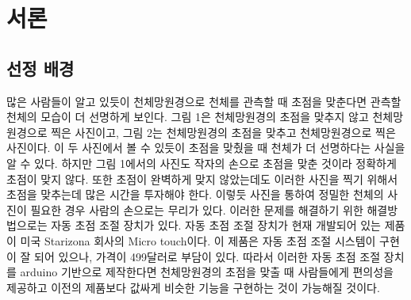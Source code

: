 \documentclass{abstract_hutech}
\begin{document}
\thispagestyle{firstpage}

\section{서론}

\subsection{선정 배경}

많은 사람들이 알고 있듯이 천체망원경으로 천체를 관측할 때 초점을 맞춘다면 관측할 천체의 모습이 더 선명하게 보인다. 그림 1은 천체망원경의 초점을 맞추지 않고 천체망원경으로 찍은 사진이고, 그림 2는 천체망원경의 초점을 맞추고 천체망원경으로 찍은 사진이다. 이 두 사진에서 볼 수 있듯이 초점을 맞췄을 때 천체가 더 선명하다는 사실을 알 수 있다. 하지만 그림 1에서의 사진도 작자의 손으로 초점을 맞춘 것이라 정확하게 초점이 맞지 않다. 또한 초점이 완벽하게 맞지 않았는데도 이러한 사진을 찍기 위해서 초점을 맞추는데 많은 시간을 투자해야 한다. 이렇듯 사진을 통하여 정밀한 천체의 사진이 필요한 경우 사람의 손으로는 무리가 있다. 이러한 문제를 해결하기 위한 해결방법으로는 자동 초점 조절 장치가 있다. 자동 초점 조절 장치가 현재 개발되어 있는 제품이 미국 Starizona 회사의 Micro touch이다. 이 제품은 자동 초점 조절 시스템이 구현이 잘 되어 있으나, 가격이 499달러로 부담이 있다. 따라서 이러한 자동 초점 조절 장치를 arduino 기반으로 제작한다면 천체망원경의 초점을 맞출 때 사람들에게 편의성을 제공하고 이전의 제품보다 값싸게 비슷한 기능을 구현하는 것이 가능해질 것이다.
\end{document}
